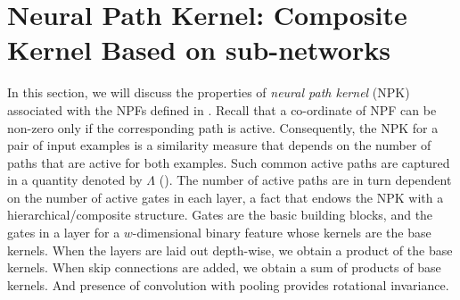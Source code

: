 \section{Neural Path Kernel: Composite Kernel Based on sub-networks}\label{sec:npk}
In this section, we will discuss the properties of \emph{neural path kernel} (NPK) associated with the NPFs defined in . Recall that a co-ordinate of NPF can be non-zero only if the corresponding path is active. Consequently, the NPK for a pair of input examples is a similarity measure that depends on the number of paths that are active for both examples. Such common active paths are captured in a quantity denoted by $\Lambda$ (). The number of active paths are in turn dependent on the number of active gates in each layer, a fact that endows the NPK with a hierarchical/composite structure. Gates are the basic building blocks, and the gates in a layer for a $w$-dimensional binary feature whose kernels are the base kernels. When the layers are laid out depth-wise, we obtain a product of the base kernels. When skip connections are added, we obtain a sum of products of base kernels. And presence of convolution with pooling  provides rotational invariance. 


